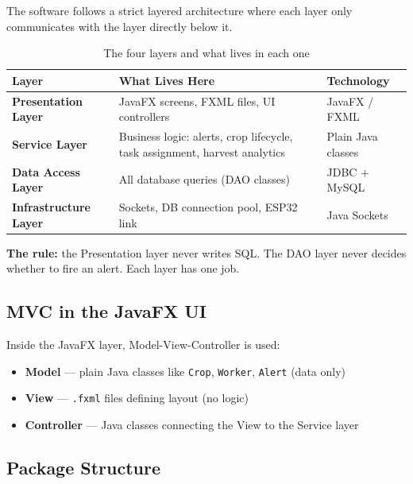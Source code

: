 \documentclass[12pt, a4paper]{report}
\begin{document}
The software follows a strict layered architecture where each layer only communicates with the layer directly below it.

\begin{table}[H]
\centering
\renewcommand{\arraystretch}{1.6}
\begin{tabularx}{\textwidth}{>{\centering\bfseries}p{3.5cm} X >{\centering\arraybackslash}p{3.5cm}}
\toprule
\textbf{Layer} & \textbf{What Lives Here} & \textbf{Technology} \\
\midrule
Presentation Layer     & JavaFX screens, FXML files, UI controllers & JavaFX / FXML \\
Service Layer          & Business logic: alerts, crop lifecycle, task assignment, harvest analytics & Plain Java classes \\
Data Access Layer      & All database queries (DAO classes) & JDBC + MySQL \\
Infrastructure Layer   & Sockets, DB connection pool, ESP32 link & Java Sockets \\
\bottomrule
\end{tabularx}
\caption{The four layers and what lives in each one}
\end{table}

\textbf{The rule:} the Presentation layer never writes SQL. The DAO layer never decides whether to fire an alert. Each layer has one job.

\subsection{MVC in the JavaFX UI}

Inside the JavaFX layer, Model-View-Controller is used:
\begin{itemize}
    \item \textbf{Model} --- plain Java classes like \texttt{Crop}, \texttt{Worker}, \texttt{Alert} (data only)
    \item \textbf{View} --- \texttt{.fxml} files defining layout (no logic)
    \item \textbf{Controller} --- Java classes connecting the View to the Service layer
\end{itemize}

\subsection{Package Structure}
\end{document}
